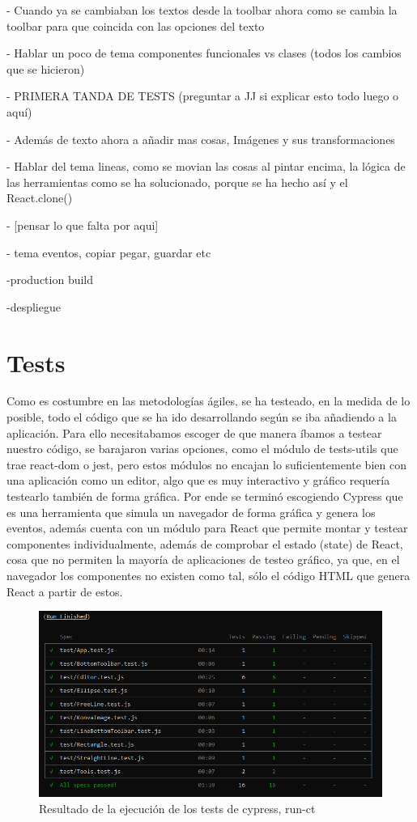 - Cuando ya se cambiaban los textos desde la toolbar ahora como se cambia la toolbar para que coincida con las opciones del texto

- Hablar un poco de tema componentes funcionales vs clases (todos los cambios que se hicieron)

- PRIMERA TANDA DE TESTS (preguntar a JJ si explicar esto todo luego o aquí)

- Además de texto ahora a añadir mas cosas, Imágenes y sus transformaciones

- Hablar del tema lineas, como se movian las cosas al pintar encima, la lógica de las herramientas
  como se ha solucionado, porque se ha hecho así y el React.clone()

- [pensar lo que falta por aqui]

- tema eventos, copiar pegar, guardar etc

-production build

-despliegue

\fi

\newpage
\section{Tests}

Como es costumbre en las metodologías ágiles, se ha testeado, en la medida de lo posible,
todo el código que se ha ido desarrollando según se iba añadiendo a la aplicación.
Para ello necesitabamos escoger de que manera íbamos a testear nuestro código, se barajaron
varias opciones, como el módulo de tests-utils que trae react-dom \cite{react-dom} o jest, 
pero estos módulos no encajan lo suficientemente bien con una aplicación como un editor, 
algo que es muy interactivo y gráfico requería testearlo también de forma gráfica. Por ende
se terminó escogiendo Cypress \cite{cypress} que es una herramienta que simula un navegador de
forma gráfica y genera los eventos, además cuenta con un módulo para React \cite{cypressReact} que permite montar
y testear componentes individualmente, además de comprobar el estado (state) de React, cosa
que no permiten la mayoría de aplicaciones de testeo gráfico, ya que, en el navegador los
componentes no existen como tal, sólo el código HTML que genera React a partir de estos.

\begin{figure}[!h]
  \centering
  \includegraphics[scale=0.6]{img/TestsOK.png}
  \caption{Resultado de la ejecución de los tests de cypress, run-ct}
\end{figure}

